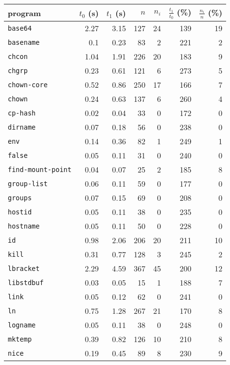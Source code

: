 \documentclass[12pt,oneside]{fithesis2}
\theoremstyle{definition}
\begin{document}
\begin{table}[ht!]
  \scriptsize
  \centering
  \begin{tabular}{l rrrr | rr}
    program & $t_0$ (s) & $t_1$ (s) & $n$ & $n_i$ & $\frac{t_1}{t_0}$ (\%) & $\frac{n_i}{n}$ (\%) \\
    \midrule

    \texttt{base64} & 2.27 & 3.15 & 127 & 24 & 139 & 19 \\
    \texttt{basename} & 0.1 & 0.23 & 83 & 2 & 221 & 2 \\
    \texttt{chcon} & 1.04 & 1.91 & 226 & 20 & 183 & 9 \\
    \texttt{chgrp} & 0.23 & 0.61 & 121 & 6 & 273 & 5 \\
    \texttt{chown-core} & 0.52 & 0.86 & 250 & 17 & 166 & 7 \\
    \texttt{chown} & 0.24 & 0.63 & 137 & 6 & 260 & 4 \\
    \texttt{cp-hash} & 0.02 & 0.04 & 33 & 0 & 172 & 0 \\
    \texttt{dirname} & 0.07 & 0.18 & 56 & 0 & 238 & 0 \\
    \texttt{env} & 0.14 & 0.36 & 82 & 1 & 249 & 1 \\
    \texttt{false} & 0.05 & 0.11 & 31 & 0 & 240 & 0 \\
    \texttt{find-mount-point} & 0.04 & 0.07 & 25 & 2 & 185 & 8 \\
    \texttt{group-list} & 0.06 & 0.11 & 59 & 0 & 177 & 0 \\
    \texttt{groups} & 0.07 & 0.15 & 69 & 0 & 208 & 0 \\
    \texttt{hostid} & 0.05 & 0.11 & 38 & 0 & 235 & 0 \\
    \texttt{hostname} & 0.05 & 0.11 & 50 & 0 & 228 & 0 \\
    \texttt{id} & 0.98 & 2.06 & 206 & 20 & 211 & 10 \\
    \texttt{kill} & 0.31 & 0.77 & 128 & 3 & 245 & 2 \\
    \texttt{lbracket} & 2.29 & 4.59 & 367 & 45 & 200 & 12 \\
    \texttt{libstdbuf} & 0.03 & 0.05 & 15 & 1 & 188 & 7 \\
    \texttt{link} & 0.05 & 0.12 & 62 & 0 & 241 & 0 \\
    \texttt{ln} & 0.75 & 1.28 & 267 & 21 & 170 & 8 \\
    \texttt{logname} & 0.05 & 0.11 & 38 & 0 & 248 & 0 \\
    \texttt{mktemp} & 0.39 & 0.82 & 126 & 10 & 210 & 8 \\
    \texttt{nice} & 0.19 & 0.45 & 89 & 8 & 230 & 9 \\

\end{tabular}
\end{table}
\end{document}
